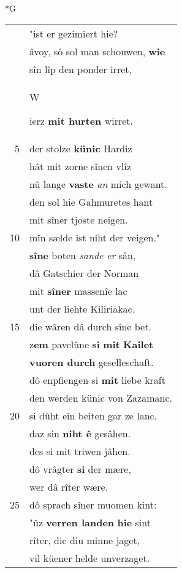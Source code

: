 \documentclass[8pt,a4paper,notitlepage]{article}
\begin{document}
\begin{table}[ht]
\begin{minipage}[t]{0.5\linewidth}
\small
\begin{center}*G
\end{center}
\begin{tabular}{rl}
 & "ist er gezimiert hie?\\ 
 & âvoy, sô sol man schouwen, \textbf{wie}\\ 
 & sîn lîp den ponder irret,\\ 
 & \begin{large}W\end{large}ierz \textbf{mit hurten} wirret.\\ 
5 & der stolze \textbf{künic} Hardiz\\ 
 & hât mit zorne sînen vlîz\\ 
 & nû lange \textbf{vaste} \textit{an} mich gewant.\\ 
 & den sol hie Gahmuretes hant\\ 
 & mit sîner tjoste neigen.\\ 
10 & mîn sælde ist niht der veigen."\\ 
 & \textbf{sîne} boten \textit{sande er} sân,\\ 
 & dâ Gatschier der Norman\\ 
 & mit \textbf{sîner} massenîe lac\\ 
 & unt der liehte Kiliriakac.\\ 
15 & die wâren dâ durch sîne bet.\\ 
 & z\textbf{em} pavelûne \textbf{si} \textbf{mit} \textbf{Kailet}\\ 
 & \textbf{vuoren durch} geselleschaft.\\ 
 & dô enpfiengen si \textbf{mit} liebe kraft\\ 
 & den werden künic von Zazamanc.\\ 
20 & si dûht ein beiten gar ze lanc,\\ 
 & daz sin \textbf{niht ê} gesâhen.\\ 
 & des si mit triwen jâhen.\\ 
 & dô vrâgter \textbf{si} der mære,\\ 
 & wer dâ rîter wære.\\ 
25 & dô sprach sîner muomen kint:\\ 
 & "ûz \textbf{verren landen} \textbf{hie} sint\\ 
 & rîter, die diu minne jaget,\\ 
 & vil küener helde unverzaget.\\ 

\end{tabular}
\end{minipage}
\end{table}
\end{document}
